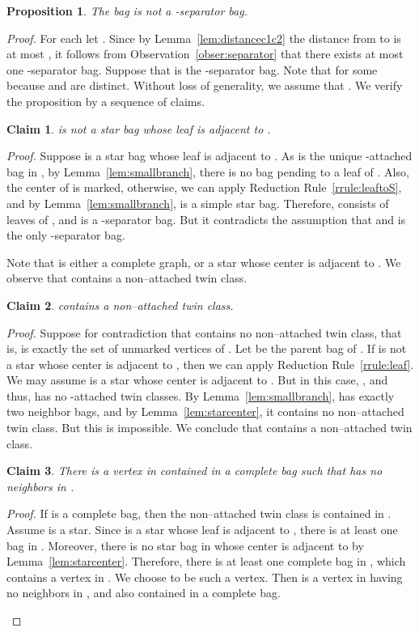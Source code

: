 \documentclass[11pt]{elsarticle}
\newtheorem{PROP}[theorem]{Proposition}
\newtheorem{claim}{Claim}
\newenvironment{clproof}{\begin{list}{}{\setlength{\leftmargin}{5mm}} \item {\it Proof.} }{\hfill\end{list}\medskip}
\begin{document}
\begin{PROP}
  \label{prop:anticomplete1}
 The bag  is not a -separator bag.
\end{PROP}
\begin{proof}
For each  let .
Since by Lemma~\ref{lem:distancec1c2} the distance from  to  is at most , it follows from Observation~\ref{obser:separator} that there exists at most one -separator bag. Suppose that  is the -separator bag.
Note that  for some  because  and  are distinct. Without loss of generality, we assume that .
We verify the proposition by a sequence of claims.

\begin{claim}
 is not a star bag whose leaf is adjacent to .
\end{claim}
\begin{clproof}
Suppose  is a star bag whose leaf is adjacent to . As  is the unique -attached bag in , 
by Lemma~\ref{lem:smallbranch}, there is no bag pending to a leaf of .
Also, the center of  is marked, otherwise, we can apply Reduction Rule~\ref{rrule:leaftoS}, and by Lemma~\ref{lem:smallbranch},  is a simple star bag.
Therefore,  consists of leaves of , and  is a -separator bag. But it contradicts the assumption that  and  is the only -separator bag.
\end{clproof}

Note that  is either a complete graph, or a star whose center is adjacent to .
We observe that  contains a non--attached twin class.
\begin{claim}
 contains a non--attached twin class.
\end{claim}
\begin{clproof}
Suppose for contradiction that  contains no non--attached twin class, that is,  is exactly the set of unmarked vertices of . 
Let  be the parent bag of . 
If  is not a star whose center is adjacent to , then we can apply Reduction Rule~\ref{rrule:leaf}.
We may assume  is a star whose center is adjacent to . But in this case, , 
and thus,  has no -attached twin classes. By Lemma~\ref{lem:smallbranch},  has exactly two neighbor bags, and by Lemma~\ref{lem:starcenter},  
it contains no non--attached twin class. But this is impossible.
We conclude that  contains a non--attached twin class.
\end{clproof}

\begin{claim}
There is a vertex  in  contained in a complete bag such that  has no neighbors in .
\end{claim}
\begin{clproof}
If  is a complete bag, then the non--attached twin class is contained in .
Assume  is a star. Since  is a star whose leaf is adjacent to , 
there is at least one bag in . Moreover, there is no star bag  in  whose center is adjacent to  by Lemma~\ref{lem:starcenter}.
Therefore, there is at least one complete bag in , which contains a vertex in .
We choose  to be such a vertex. Then  is a vertex in  having no neighbors in , and 
also contained in a complete bag.
\end{clproof}


\end{proof}
\end{document}

